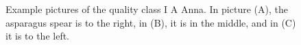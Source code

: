 \begin{figure}
    \centering
    \qquad
    \qquad
    \caption[Example of asparagus images]{Example pictures of the quality class I A Anna. In picture (A), the asparagus spear is to the right, in (B), it is in the middle, and in (C) it is to the left.}
    \label{fig:ExampleImagesAnna}
\end{figure}

